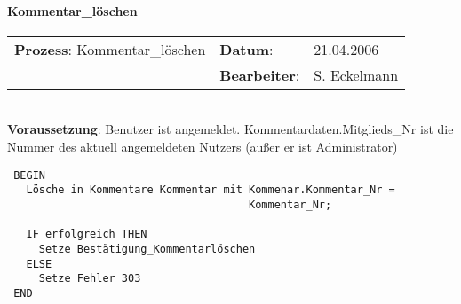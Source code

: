 \paragraph{Kommentar\_löschen}
\begin{tabular}[t]{p{9.5cm}ll}
\textbf{Prozess}: Kommentar\_löschen  	&\textbf{Datum}:      &21.04.2006\\
					&\textbf{Bearbeiter}: &S. Eckelmann\\
\end{tabular}

\hrulefill\\
\textbf{Voraussetzung}: Benutzer ist angemeldet. Kommentardaten.Mitglieds\_Nr ist die Nummer des aktuell angemeldeten Nutzers (außer er ist Administrator)
\begin{verbatim}
 BEGIN
   Lösche in Kommentare Kommentar mit Kommenar.Kommentar_Nr = 
                                      Kommentar_Nr;
   
   IF erfolgreich THEN
     Setze Bestätigung_Kommentarlöschen
   ELSE
     Setze Fehler 303
 END
\end{verbatim}
\hrulefill